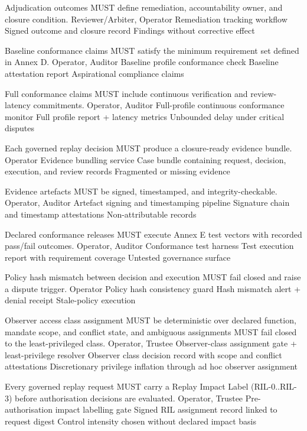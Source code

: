 \documentclass[11pt]{article}
\theoremstyle{definition}
\theoremstyle{plain}
\theoremstyle{remark}
\begin{document}
{Adjudication outcomes MUST define remediation, accountability owner, and closure condition.}
{Reviewer/Arbiter, Operator}
{Remediation tracking workflow}
{Signed outcome and closure record}
{Findings without corrective effect}

{Baseline conformance claims MUST satisfy the minimum requirement set defined in Annex D.}
{Operator, Auditor}
{Baseline profile conformance check}
{Baseline attestation report}
{Aspirational compliance claims}

{Full conformance claims MUST include continuous verification and review-latency commitments.}
{Operator, Auditor}
{Full-profile continuous conformance monitor}
{Full profile report + latency metrics}
{Unbounded delay under critical disputes}

{Each governed replay decision MUST produce a closure-ready evidence bundle.}
{Operator}
{Evidence bundling service}
{Case bundle containing request, decision, execution, and review records}
{Fragmented or missing evidence}

{Evidence artefacts MUST be signed, timestamped, and integrity-checkable.}
{Operator, Auditor}
{Artefact signing and timestamping pipeline}
{Signature chain and timestamp attestations}
{Non-attributable records}

{Declared conformance releases MUST execute Annex E test vectors with recorded pass/fail outcomes.}
{Operator, Auditor}
{Conformance test harness}
{Test execution report with requirement coverage}
{Untested governance surface}

{Policy hash mismatch between decision and execution MUST fail closed and raise a dispute trigger.}
{Operator}
{Policy hash consistency guard}
{Hash mismatch alert + denial receipt}
{Stale-policy execution}

{Observer access class assignment MUST be deterministic over declared function, mandate scope, and conflict state, and ambiguous assignments MUST fail closed to the least-privileged class.}
{Operator, Trustee}
{Observer-class assignment gate + least-privilege resolver}
{Observer class decision record with scope and conflict attestations}
{Discretionary privilege inflation through ad hoc observer assignment}

{Every governed replay request MUST carry a Replay Impact Label (RIL-0..RIL-3) before authorisation decisions are evaluated.}
{Operator, Trustee}
{Pre-authorisation impact labelling gate}
{Signed RIL assignment record linked to request digest}
{Control intensity chosen without declared impact basis}
\end{document}
